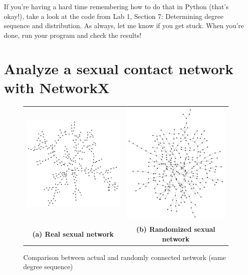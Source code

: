 \documentclass{article}
\begin{document}
If you're having a hard time remembering how to do that in Python (that's okay!), take a look at the code from Lab 1, Section 7: Determining degree
 sequence and distribution.  As always, let me know if you get stuck.  When you're done, run your program and check the results!

\pagebreak

\section{Analyze a sexual contact network with NetworkX}

\UndefineShortVerb{\|}
\begin{figure}[!ht]

\begin{center}
\begin{tabular}{cc}
\includegraphics[width = 3in]{sexual_net.pdf} &\includegraphics[width = 3in]{shuffled_sex.pdf}\\
\textbf{(a) Real sexual network} & \textbf{(b) Randomized sexual network}\\
\end{tabular}
\caption{Comparison between actual and randomly connected network (same degree sequence)}
\label{sex_fig}
\end{center}
\end{figure}
\DefineShortVerb{\|}
\end{document}
